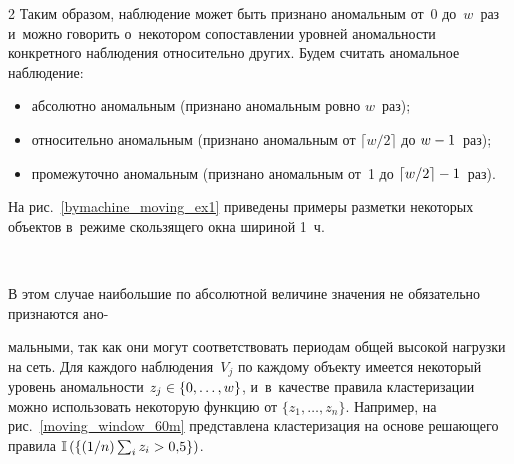 \begin{multicols}{2}
\noindent
Таким образом, 
наблюдение может быть признано аномальным от~0 до~$w$~раз и~мож\-но говорить 
о~некотором со\-по\-став\-ле\-нии уровней ано\-маль\-ности
конкретного наблюдения относительно 
других. Будем считать аномальное наблюдение:

\noindent
\begin{itemize}
    \item абсолютно аномальным (признано аномальным ров\-но $w$~раз);
    \item относительно аномальным (признано аномальным от $\lceil {w}/{2} 
\rceil$ до $w\hm - 1$~раз);
    \item промежуточно аномальным (признано аномальным от~1 до $\lceil 
{w}/{2} \rceil \hm- 1$~раз).
\end{itemize}


\noindent
На рис.~\ref{bymachine_moving_ex1} 
приведены примеры разметки некоторых объектов в~режиме сколь\-зя\-ще\-го окна шириной 
1~ч.
{

}

\begin{figure*} %
\vspace*{1pt}
\begin{center}
   \mbox{%
\epsfxsize=148.725mm 
}
\end{center}
\vspace*{-9pt}
\label{bymachine_moving_ex1}
\end{figure*}

В этом случае наибольшие по абсолютной величине значения не обязательно 
признаются ано-\linebreak
\vspace*{-12pt}

\noindent
мальными, так как они могут соответствовать периодам об\-щей высокой 
на\-груз\-ки на сеть. Для каж\-до\-го наблюдения~$V_j$ по каж\-до\-му объекту имеется 
некоторый уровень ано\-маль\-ности $z_j \hm\in \{0,\ldots,w\}$, и~в~качестве правила 
клас\-те\-ри\-за\-ции мож\-но использовать некоторую функ\-цию от $\{z_1,\ldots,z_n\}$. 
Например, на рис.~\ref{moving_window_60m} пред\-став\-ле\-на клас\-те\-ри\-за\-ция на основе 
ре\-ша\-юще\-го правила $\mathbb{I}\left( \left\{({1}/{n}) \sum\nolimits_i z_i\hm > 0{,}5\right \}\right)$. 


\end{multicols}
